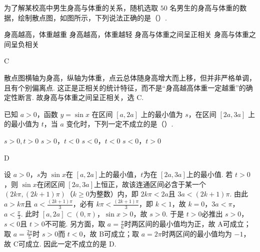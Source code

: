 \begin{problem}
为了解某校高中男生身高与体重的关系，随机选取 \(50\) 名男生的身高与体重的数据，绘制散点图，如图所示，下列说法正确的是（\quad）.


\choices
    {身高越高，体重越重}
    {身高越高，体重越轻}
    {身高与体重之间呈正相关}
    {身高与体重之间呈负相关}
\end{problem}

\begin{answer}
C
\end{answer}

\begin{solution}
散点图横轴为身高，纵轴为体重，点云总体随身高增大而上移，但并非严格单调，且有个别偏离点. 这正是正相关的统计特征，而不是“身高越高体重一定越重”的确定性断言. 故身高与体重之间呈正相关，选 C.
\end{solution}

\begin{problem}
已知 \(a>0\)，函数 \(y=\sin x\) 在区间 \(\left[a,2a\right]\) 上的最小值为 \(s\)，在区间 \(\left[2a,3a\right]\) 上的最小值为 \(t\)，当 \(a\) 变化时，下列一定不成立的是（\quad）.

\choices
    {\(s>0,t>0\)}
    {\(s>0\)，\(t<0\)}
    {\(s<0\)，\(t<0\)}
    {\(s<0\)，\(t>0\)}
\end{problem}

\begin{answer}
D
\end{answer}

\begin{solution}
设 \(a>0\)，\(s\)为 \(\sin x\)在 \(\left[a,2a\right]\)上的最小值，\(t\)为在 \(\left[2a,3a\right]\)上的最小值. 若 \(t>0\)，则 \(\sin x\)在闭区间 \(\left[2a,3a\right]\)上恒正，故该连通区间必含于某一个 \(\left(2k\pi,\left(2k+1\right)\pi\right)\)（\(k\ge 0\)为整数）内，即 \(2k\pi<2a\)且 \(3a<\left(2k+1\right)\pi\). 由此 \(a>k\pi\)且 \(a<\frac{\left(2k+1\right)\pi}{3}\)，必有 \(k\pi<\frac{\left(2k+1\right)\pi}{3}\)，即 \(k<1\)，故 \(k=0\)，\(3a<\pi\)，\(a<\frac{\pi}{3}\). 此时 \(\left[a,2a\right]\subset\left(0,\pi\right)\)，\(\sin x>0\)，故 \(s>0\). 于是 \(t>0\)必推出 \(s>0\)，\(s<0\)且 \(t>0\)不可能. 另方面，取 \(a=\frac{\pi}{6}\)时两区间的最小值均为正，故 A可成立；取 \(a=\frac{2\pi}{5}\)时 \(s>0\)而 \(t<0\)，故 B可成立；取 \(a=2\pi\)时两区间的最小值均为 \(-1\)，故 C可成立. 因此一定不成立的是 D.
\end{solution}

